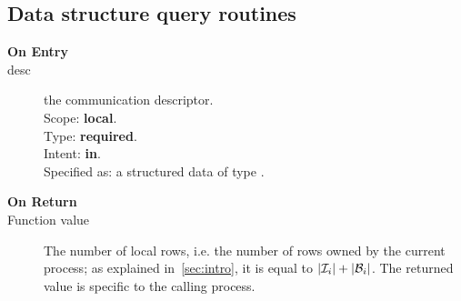 

\subsection{Data structure query routines}
\label{sec:dataquery}


\begin{description}
\item[\bf On Entry]
\item[desc] the communication descriptor.\\
Scope: {\bf local}.\\
Type: {\bf required}.\\
Intent: {\bf in}.\\
Specified as: a structured data of type \descdata.
\end{description}

\begin{description}
\item[\bf On Return]
\item[Function value] The number of local rows, i.e. the number of
  rows owned by the current process; as explained in~\ref{sec:intro},
  it is equal to $|{\cal I}_i| + |{\cal B}_i|$. The returned value is
  specific to the calling process. 
\end{description}


